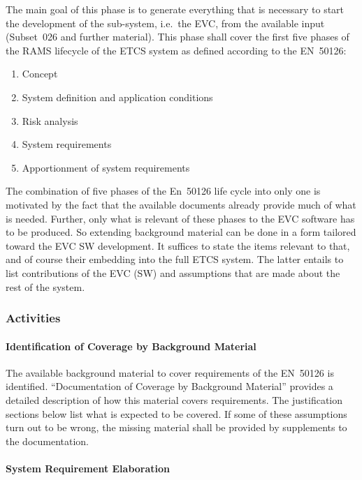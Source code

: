 \documentclass{template/openetcs_article}
\begin{document}
The main goal of this phase is to generate everything that is
necessary to start the development of the sub-system, i.e.\ the EVC,
from the available input (Subset~026 and further material). This phase
shall cover the first five phases of the RAMS lifecycle of the ETCS
system as defined according to the EN~50126:
\begin{enumerate}
\item Concept
\item System definition and application conditions
\item Risk analysis
\item System requirements
\item Apportionment of system requirements
\end{enumerate}
The combination of five phases of the En~50126 life cycle into only
one is motivated by the fact that the available documents already
provide much of what is needed. Further, only what is relevant of
these phases to the EVC software has to be produced. So extending
background material can be done in a form tailored toward the EVC SW
development. It suffices to state the items relevant to that, and of
course their embedding into the full ETCS system. The latter entails
to list contributions of the EVC (SW) and assumptions that are made
about the rest of the system.


\subsubsection{Activities}
\label{sec:1-activities}

\paragraph{Identification of Coverage by Background Material}
\label{sec:1-a-0}

The available background material to cover requirements of the
EN~50126 is identified. ``Documentation of Coverage by Background
Material'' provides a detailed description of how this material
covers requirements. The justification sections below list what is
expected to be covered. If some of these assumptions turn out to be
wrong, the missing material shall be provided by supplements to the
documentation.  

\paragraph{System Requirement Elaboration}
\label{sec:1-a-1}
\end{document}
